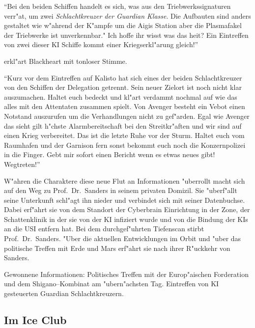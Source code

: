 "`Bei den beiden Schiffen handelt es sich, was aus den Triebwerkssignaturen verr"at, um zwei \emph{Schlachtkreuzer der Guardian Klasse}. Die Aufbauten sind anders gestaltet wie w"ahrend der K"ampfe um die Aigis Station aber die Plasmafakel der Triebwerke ist unverkennbar." Ich hoffe ihr wisst was das hei\3t? Ein Eintreffen von zwei dieser KI Schiffe kommt einer Kriegserkl"arung gleich!"' 

erkl"art Blackheart mit tonloser Stimme. 

"`Kurz vor dem Eintreffen auf Kalisto hat sich eines der beiden Schlachtkreuzer von den Schiffen der Delegation getrennt. Sein neuer Zielort ist noch nicht klar auszumachen. Haltet euch bedeckt und kl"art verdammt nochmal auf wie das alles mit den Attentaten zusammen spielt. Von Avenger besteht ein Vebot einen Notstand auszurufen um die Verhandlungen nicht zu gef"arden. Egal wie Avenger das sieht gilt h"chste Alarmbereitschaft bei den Streitkr"aften und wir sind auf einen Krieg verbereitet. Das ist die letzte Ruhe vor der Sturm. Haltet euch vom Raumhafen und der Garnison fern sonst bekommt euch noch die Konzernpolizei in die Finger. Gebt mir sofort einen Bericht wenn es etwas neues gibt! Wegtreten!"'

W"ahren die Charaktere diese neue Flut an Informationen "uberrollt macht sich \xl{} auf den Weg zu Prof.~Dr.~Sanders in seinem privaten Domizil. Sie "uberf"allt seine Unterkunft schl"agt ihn nieder und verbindet sich mit seiner Datenbuchse. Dabei erf"ahrt sie von dem Standort der Cyberbrain Einrichtung in der Zone, der Schattenklinik in der sie von der KI infiziert wurde und von \emph{} die Bindung der KIs an die USI entfern hat. Bei dem durchgef"uhrten Tiefenscan stirbt Prof.~Dr.~Sanders. "Uber die aktuellen Entwicklungen im Orbit und "uber das politische Treffen mit Erde und Mars erf"ahrt sie nach ihrer R"uckkehr von Sanders.

\begin{remarks}
	Gewonnene Informationen: Politisches Treffen mit der Europ"aischen Forderation und dem Shigano--Kombinat am "ubern"achsten Tag. Eintreffen von KI gesteuerten Guardian Schlachtkreuzern.
\end{remarks}

\subsection{Im Ice Club}


